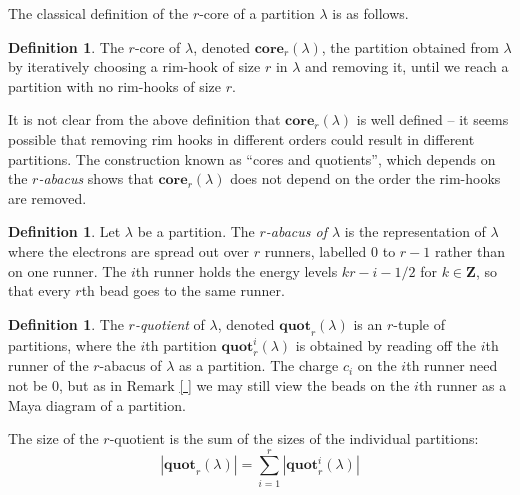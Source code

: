 \documentclass{amsart}[12pt]
\theoremstyle{definition}
\newtheorem{definition}[dummy]{Definition}
\newcommand{\Z}{\mathbf{Z}}
\newcommand{\core}{\mathbf{core}}
\newcommand{\quot}{\mathbf{quot}}
\begin{document}
The classical definition of the $r$-core of a partition $\lambda$ is as follows.

\begin{definition} 
The $r$-core of $\lambda$, denoted $\core_r(\lambda)$, the partition obtained from $\lambda$ by iteratively choosing a rim-hook of size $r$ in $\lambda$ and removing it, until we reach a partition with no rim-hooks of size $r$.
\end{definition}

It is not clear from the above definition that $\core_r(\lambda)$ is well defined -- it seems possible that removing rim hooks in different orders could result in different partitions.  The construction known as ``cores and quotients'', which depends on the \emph{$r$-abacus} shows that $\core_r(\lambda)$ does not depend on the order the rim-hooks are removed.  


\begin{definition}
  Let $\lambda$ be a partition.  The \emph{$r$-abacus of $\lambda$} is the representation of $\lambda$ where the electrons are spread out over $r$ runners, labelled 0 to $r-1$ rather than on one runner.  The $i$th runner holds the energy levels $kr-i-1/2$ for $k\in\Z$, so that every $r$th bead goes to the same runner.  
\end{definition}

\begin{definition} \label{def:quotients}
The \emph{$r$-quotient} of $\lambda$, denoted $\quot_r(\lambda)$ is an $r$-tuple of partitions, where the $i$th partition $\quot_r^i(\lambda)$ is obtained by reading off the $i$th runner of the $r$-abacus of $\lambda$ as a partition.  The charge $c_i$ on the $i$th runner need not be 0, but as in Remark \ref{ } we may still view the beads on the $i$th runner as a Maya diagram of a partition. 

The size of the $r$-quotient is the sum of the sizes of the individual partitions: 
$$|\quot_r(\lambda)|=\sum_{i=1}^r |\quot_r^i(\lambda)|$$
\end{definition}
\end{document}

